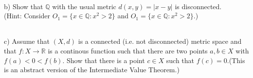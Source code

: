 \documentclass[12pt,letterpaper]{article}
\begin{document}
\noindent \\
b) Show that $\mathbb{Q}$ with the usual metric $d(x,y)=|x-y|$ is disconnected. \\
(Hint: Consider $O_1=\{x\in\mathbb{Q} : x^2 > 2\}$ and $O_1=\{x\in\mathbb{Q} : x^2 > 2\}$.)




\noindent \\
c) Assume that $(X,d)$ is a connected (i.e. not disconnected) metric space and that $f : X \to \mathbb{R}$ is a continous function such that there are two points $a,b \in X$ with $f(a)<0<f(b)$. Show that there is a point $c\in X$ such that $f(c)=0$.(This is an abstract version of the Intermediate Value Theorem.)
\end{document}
